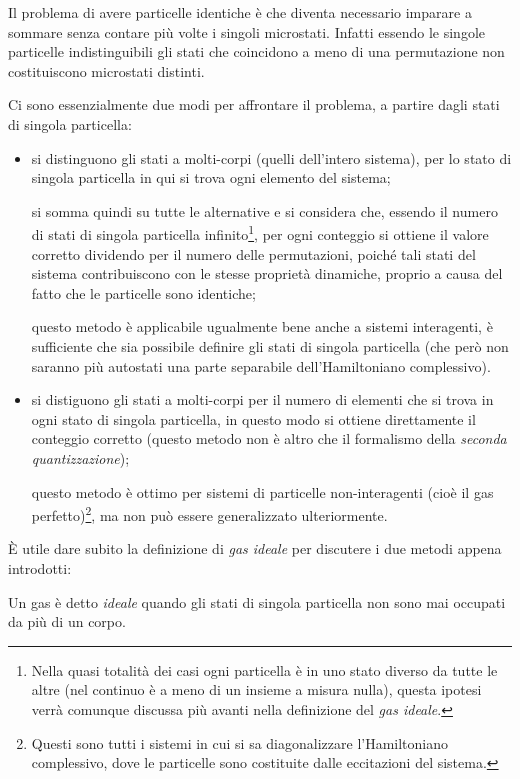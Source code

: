 Il problema di avere particelle identiche è che diventa necessario imparare a sommare senza contare più volte i singoli microstati. Infatti essendo le singole particelle indistinguibili gli stati che coincidono a meno di una permutazione non costituiscono microstati distinti.

Ci sono essenzialmente due modi per affrontare il problema, a partire dagli stati di singola particella:
\begin{itemize}
	\item si distinguono gli stati a molti-corpi (quelli dell'intero sistema), per lo stato di singola particella in qui si trova ogni elemento del sistema;
	
	si somma quindi su tutte le alternative e si considera che, essendo il numero di stati di singola particella infinito\footnote{Nella quasi totalità dei casi ogni particella è in uno stato diverso da tutte le altre (nel continuo è a meno di un insieme a misura nulla), questa ipotesi verrà comunque discussa più avanti nella definizione del \textit{gas ideale}.}, per ogni conteggio si ottiene il valore corretto dividendo per il numero delle permutazioni, poiché tali stati del sistema contribuiscono con le stesse proprietà dinamiche, proprio a causa del fatto che le particelle sono identiche;
	
	questo metodo è applicabile ugualmente bene anche a sistemi interagenti, è sufficiente che sia possibile definire gli stati di singola particella (che però non saranno più autostati una parte separabile dell'Hamiltoniano complessivo).
	
	\item si distiguono gli stati a molti-corpi per il numero di elementi che si trova in ogni stato di singola particella, in questo modo si ottiene direttamente il conteggio corretto (questo metodo non è altro che il formalismo della \textit{seconda quantizzazione});
	
	questo metodo è ottimo per sistemi di particelle non-interagenti (cioè il gas perfetto)\footnote{Questi sono tutti i sistemi in cui si sa diagonalizzare l'Hamiltoniano complessivo, dove le particelle sono costituite dalle eccitazioni del sistema.}, ma non può essere generalizzato ulteriormente.
\end{itemize}

\noindent \`E utile dare subito la definizione di \textit{gas ideale} per discutere i due metodi appena introdotti:

\begin{defn}
	\label{def:idgas}
	Un gas è detto \textit{ideale} quando gli stati di singola particella non sono mai occupati da più di un corpo.
\end{defn}

